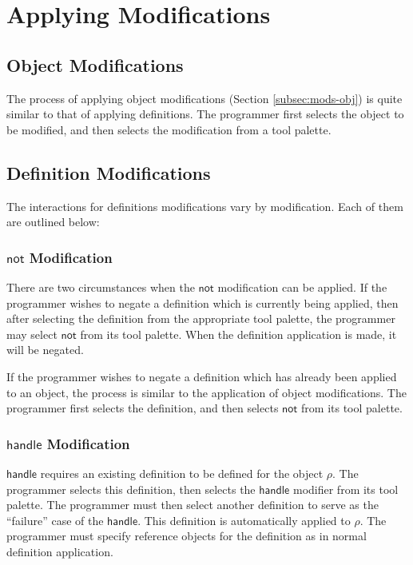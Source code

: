\documentclass[twoside,11pt]{report}
\begin{document}
\section{Applying Modifications}
\label{sec:applymod}

\subsection{Object Modifications}
\label{subsec:mod-obj}

The process of applying object modifications (Section \ref{subsec:mods-obj}) is quite similar to that of applying definitions.
The programmer first selects the object to be modified, and then selects the modification from a tool palette.

\subsection{Definition Modifications}
\label{subsec:mod-def}

The interactions for definitions modifications vary by modification.
Each of them are outlined below:

\subsubsection{$\mathsf{not}$ Modification}

There are two circumstances when the $\mathsf{not}$ modification can be applied. 
If the programmer wishes to negate a definition which is currently being applied, then after selecting the definition from the appropriate tool palette, the programmer may select $\mathsf{not}$ from its tool palette.
When the definition application is made, it will be negated.

If the programmer wishes to negate a definition which has already been applied to an object, the process is similar to the application of object modifications.
The programmer first selects the definition, and then selects $\mathsf{not}$ from its tool palette.

\subsubsection{$\mathsf{handle}$ Modification}

$\mathsf{handle}$ requires an existing definition to be defined for the object $\rho$. 
The programmer selects this definition, then selects the $\mathsf{handle}$ modifier from its tool palette.
The programmer must then select another definition to serve as the ``failure'' case of the $\mathsf{handle}$. 
This definition is automatically applied to $\rho$. 
The programmer must specify reference objects for the definition as in normal definition application.
\end{document}
